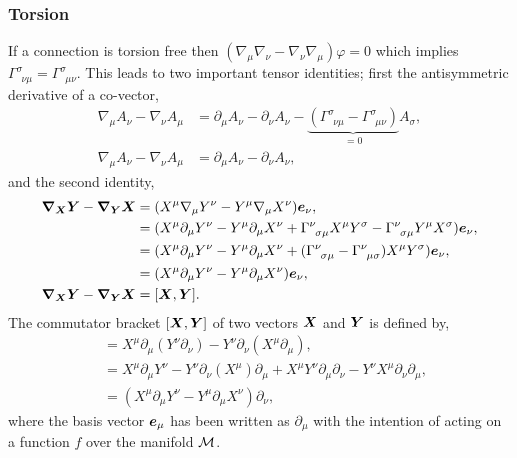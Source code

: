 \subsubsection{Torsion}
If a connection is torsion free then $(\nabla_\mu \nabla_\nu  - \nabla_\nu \nabla_\mu )\varphi=0$ which implies $\Gamma^{\sigma}_{\,\,\,\nu\mu}  = \Gamma^{\sigma}_{\,\,\,\mu\nu}$. This leads to two important tensor identities; first the antisymmetric derivative of a co-vector,
\begin{align} 
\nabla_\mu A_\nu - \nabla_\nu A_\mu &= \partial_\mu A_\nu - \partial_\nu A_\nu - \underbrace{(\Gamma^\sigma_{\,\,\,\nu\mu}- \Gamma^\sigma_{\,\,\,\mu\nu})}_{=0}A_\sigma, \\
\nabla_\mu A_\nu - \nabla_\nu A_\mu &= \partial_\mu A_\nu - \partial_\nu A_\nu, 
\end{align}
and the second identity,
\begin{align} 
\boldsymbol{\nabla}_{\boldsymbol{X}} \boldsymbol{Y} - \boldsymbol{\nabla}_{\boldsymbol{Y}}\boldsymbol{X} &= (X^\mu \nabla_\mu Y^\nu - Y^\mu \nabla_\mu X^\nu ) \boldsymbol{e}_\nu, \\
&= (X^\mu \partial_\mu Y^\nu - Y^\mu \partial_\mu X^\nu  + \Gamma^\nu_{\,\,\,\sigma\mu} X^\mu Y^\sigma - \Gamma^\nu_{\,\,\,\sigma\mu} Y^\mu X^\sigma) \boldsymbol{e}_\nu, \\ 
&= (X^\mu \partial_\mu Y^\nu - Y^\mu \partial_\mu X^\nu  + (\Gamma^\nu_{\,\,\,\sigma\mu}  - \Gamma^\nu_{\,\,\,\mu\sigma}) X^\mu Y^\sigma) \boldsymbol{e}_\nu, \\ 
&= (X^\mu \partial_\mu Y^\nu - Y^\mu \partial_\mu X^\nu  ) \boldsymbol{e}_\nu, \\ \boldsymbol{\nabla}_{\boldsymbol{X}} \boldsymbol{Y} - \boldsymbol{\nabla}_{\boldsymbol{Y}}\boldsymbol{X}&= [\boldsymbol{X},\boldsymbol{Y}]. 
\end{align}
The commutator bracket $[\boldsymbol{X},\boldsymbol{Y}]$ of two vectors $\boldsymbol{X}$ and $\boldsymbol{Y}$ is defined by, 
\begin{align}
[X^\mu \partial_\mu,Y^\nu \partial_\nu] &= X^\mu \partial_\mu (Y^\nu \partial_\nu) - Y^\nu \partial_\nu (X^\mu \partial_\mu) ,\\
&= X^\mu \partial_\mu Y^\nu  - Y^\nu \partial_\nu (X^\mu ) \partial_\mu + X^\mu Y^\nu \partial_\mu  \partial_\nu - Y^\nu X^\mu\partial_\nu  \partial_\mu ,\\
&= (X^\mu \partial_\mu Y^\nu  - Y^\mu \partial_\mu X^\nu ) \partial_\nu ,
\end{align}
where the basis vector $\boldsymbol{e}_\mu$ has been written as $\partial_\mu$ with the intention of acting on a function $f$ over the manifold $\mathcal{M}$.


